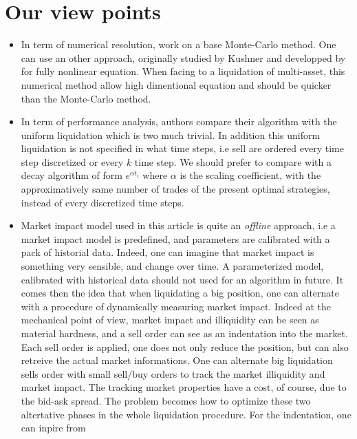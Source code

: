 \documentclass[a4paper,10pt]{article}
\begin{document}
\section{Our view points}
\begin{itemize}
 \item In term of numerical resolution, \cite{GMP} work on a base Monte-Carlo  method. One can use an other approach, originally studied by Kushner \cite{KUSH} and developped by \cite{DJ} for fully nonlinear equation. When facing to a liquidation of multi-asset, this numerical method allow high dimentional equation and should be quicker than the Monte-Carlo method. 
 \item In term of performance analysis, authors compare their algorithm with the uniform liquidation which is two much trivial. In addition this uniform liquidation is not specified in what time steps, i.e sell are ordered every time step discretized or every $k$ time step. We should prefer to compare with a decay algorithm of form $e^{\alpha t_i}$ where $\alpha$ is the scaling coefficient, with the approximatively same number of trades of the present optimal strategies, instead of every discretized time steps.
 \item Market impact model used in this article is quite an \textit{offline} approach, i.e a market impact model is predefined, and parameters are calibrated with a pack of historial data. Indeed, one can imagine that market impact is something very sensible, and change over time. A parameterized model, calibrated with historical data should not used for an algorithm in future. It comes then the idea that when liquidating a big position, one can alternate with a procedure of dynamically measuring market impact. Indeed at the mechanical point of view, market impact and illiquidity can be seen as material hardness, and a sell order can see as an indentation into the market. Each sell order is applied, one does not only reduce the position, but  can also retreive the actual market informations. One can alternate big liquidation sells order with small sell/buy orders to track the market illiquidity and market impact. The tracking market properties have a cost, of course, due to the bid-ask spread. The problem 
becomes how to optimize these two altertative phases in the whole liquidation procedure. For the indentation, one can inpire from \cite{BRIAN}       
\end{itemize}
\end{document}
